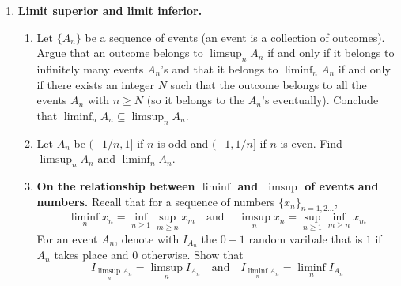 \documentclass[12pt]{article}
\begin{document}
\begin{enumerate}
\item {\bf Limit superior and limit inferior.}
\begin{enumerate}
\item Let $\{A_n\}$ be a sequence of events (an event is a collection of outcomes). Argue that an outcome belongs to $\limsup_n A_n$ if and only if it belongs to infinitely many events $A_n$'s and that it belongs to $\liminf_n A_n$ if and only if there exists an integer $N$ such that the outcome belongs to all the events $A_n$ with $n \geq N$ (so it belongs to the $A_n$'s eventually). Conclude that $\liminf_n A_n \subseteq \limsup_n A_n$.\\
\color{black}
\color{black}
\item Let $A_n$ be $(-1/n,1]$ if $n$ is odd and $(-1,1/n]$ if $n$ is even. Find $\limsup_n A_n$ and $\liminf_n A_n$.\\
\color{black}

\item {\bf On the relationship between $\liminf$ and $\limsup$ of events and numbers.} Recall that for a sequence of numbers $\{ x_n\}_{n=1,2\ldots}$,
\[
\liminf_n x_n = \inf_{n \geq 1} \sup_{m \geq n} x_m \quad \text{and} \quad \limsup_n x_n = \sup_{n \geq 1} \inf_{m \geq n} x_m
\]
For an event $A_n$, denote with $I_{A_n}$ the $0-1$ random varibale that is $1$ if $A_n$ takes place and $0$ otherwise. Show that
\[
I_{\limsup_n A_n} = \limsup_n I_{A_n} \quad \text{and} \quad I_{\liminf_n A_n} = \liminf_n I_{A_n}
\]



\end{enumerate}
\end{enumerate}
\end{document}
